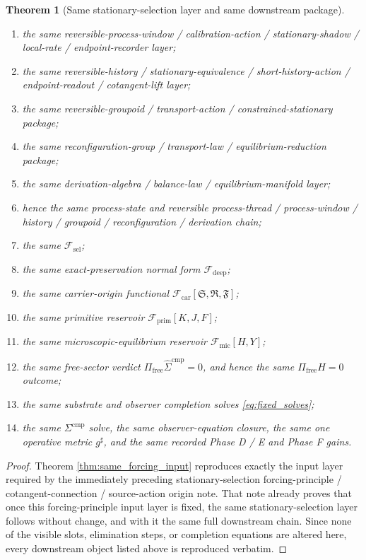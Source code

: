 \documentclass[11pt]{article}
\newcommand{\CompletedMetric}{g^{\sharp}}
\newcommand{\CompLift}{\widehat\Sigma^{\mathrm{cmp}}}
\newcommand{\FreeProj}{\Pi_{\mathrm{free}}}
\newcommand{\GaugeAux}{Y}
\newcommand{\MicFunctional}{\mathscr F_{\mathrm{mic}}}
\newcommand{\PrimFunctional}{\mathscr F_{\mathrm{prim}}}
\newcommand{\CarrierFunctional}{\mathscr F_{\mathrm{car}}}
\newcommand{\DeepFunctional}{\mathscr F_{\mathrm{deep}}}
\newcommand{\StemFunctional}{\mathscr F_{\mathrm{sel}}}
\newcommand{\PrimStrain}{K}
\newcommand{\PrimNeutral}{J}
\newcommand{\PrimFree}{F}
\newcommand{\CarrierSeed}{\mathfrak S}
\newcommand{\RelabelSeed}{\mathfrak R}
\newcommand{\FreeSeed}{\mathfrak F}
\newtheorem{theorem}{Theorem}
\begin{document}
\begin{theorem}[Same stationary-selection layer and same downstream package]
\begin{enumerate}
    \item the same reversible-process-window / calibration-action / stationary-shadow / local-rate / endpoint-recorder layer;
    \item the same reversible-history / stationary-equivalence / short-history-action / endpoint-readout / cotangent-lift layer;
    \item the same reversible-groupoid / transport-action / constrained-stationary package;
    \item the same reconfiguration-group / transport-law / equilibrium-reduction package;
    \item the same derivation-algebra / balance-law / equilibrium-manifold layer;
    \item hence the same process-state and reversible process-thread / process-window / history / groupoid / reconfiguration / derivation chain;
    \item the same \(\StemFunctional\);
    \item the same exact-preservation normal form \(\DeepFunctional\);
    \item the same carrier-origin functional \(\CarrierFunctional[\CarrierSeed,\RelabelSeed,\FreeSeed]\);
    \item the same primitive reservoir \(\PrimFunctional[\PrimStrain,\PrimNeutral,\PrimFree]\);
    \item the same microscopic-equilibrium reservoir \(\MicFunctional[H,\GaugeAux]\);
    \item the same free-sector verdict \(\FreeProj\CompLift=0\), and hence the same \(\Pi_{\mathrm{free}}H=0\) outcome;
    \item the same substrate and observer completion solves \eqref{eq:fixed_solves};
    \item the same \(\Sigma^{\mathrm{cmp}}\) solve, the same observer-equation closure, the same one operative metric \(\CompletedMetric\), and the same recorded Phase D / E and Phase F gains.
\end{enumerate}
\end{theorem}

\begin{proof}
Theorem \ref{thm:same_forcing_input} reproduces exactly the input layer required by the immediately preceding stationary-selection forcing-principle / cotangent-connection / source-action origin note. That note already proves that once this forcing-principle input layer is fixed, the same stationary-selection layer follows without change, and with it the same full downstream chain. Since none of the visible slots, elimination steps, or completion equations are altered here, every downstream object listed above is reproduced verbatim.
\end{proof}
\end{document}
